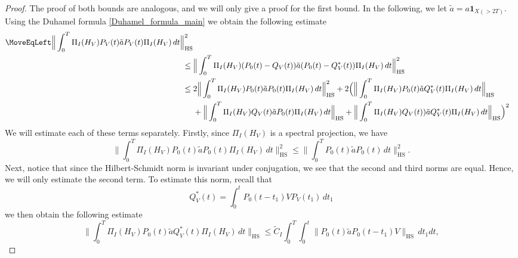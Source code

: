 \documentclass[11pt,twoside,reqno]{amsart}
\newcommand{\1}{\mathrm{\mathbf{1}}}
\newcommand{\bHS}{\mathrm{HS}}
\numberwithin{equation}{section}
\theoremstyle{plain}
\theoremstyle{definition}
\theoremstyle{remark}
\begin{document}
\begin{proof}
The proof of both bounds are analogous, and we will only give a proof for the first bound. In the following, we let $\tilde{a} = a\boldsymbol{1}_{X(>2T)}$. Using the Duhamel formula \eqref{Duhamel_formula_main} we obtain the following estimate 
\begin{equation}\label{EQ:Potential_restriction_2_1}
    \begin{aligned}
       \MoveEqLeft \Big\lVert \int_0^T \Pi_I(H_V) P_V(t) \tilde{a} P_V(t) \Pi_I(H_V) \, d t \Big\rVert_{\bHS}^2 
       \\
       \leq{}& \Big\lVert \int_0^T \Pi_I(H_V) (P_0(t) - Q_V(t))\tilde{a} (P_0(t) -Q_V^*(t)) \Pi_I(H_V) \, d t \Big\rVert_{\bHS}^2 
       \\
       \leq{}& 2\Big\lVert \int_0^T \Pi_I(H_V) P_0(t)  \tilde{a} P_0(t)  \Pi_I(H_V) \, d t \Big\rVert_{\bHS}^2
       +
       2\Big(\Big\lVert \int_0^T \Pi_I(H_V) P_0(t)  \tilde{a} Q_V^*(t) \Pi_I(H_V) \, d t \Big\rVert_{\bHS} 
       \\
       &+
       \Big\lVert \int_0^T \Pi_I(H_V) Q_V(t) \tilde{a} P_0(t)  \Pi_I(H_V) \, d t \Big\rVert_{\bHS} 
       +
       \Big\lVert \int_0^T \Pi_I(H_V) Q_V(t))\tilde{a} Q_V^*(t) \Pi_I(H_V) \, d t \Big\rVert_{\bHS}\Big)^2 
    \end{aligned}
\end{equation}
We will estimate each of these terms separately. Firstly, since $\Pi_I(H_V)$ is a spectral projection, we have
\begin{equation}\label{EQ:Potential_restriction_2_2}
    \Big\lVert \int_0^T \Pi_I(H_V) P_0(t)  \tilde{a} P_0(t)  \Pi_I(H_V) \, d t \Big\rVert_{\bHS}^2
       \leq \Big\lVert \int_0^T P_0(t)  \tilde{a} P_0(t)   \, d t \Big\rVert_{\bHS}^2.
\end{equation}
Next, notice that since the Hilbert-Schmidt norm is invariant under conjugation, we see that the second and third norms are equal. Hence, we will only estimate the second term. To estimate this norm, recall that 
\begin{equation*}
    Q_V^*(t) =  \int_{0}^{t} P_0(t-t_1) V P_V(t_1) \, dt_1
\end{equation*}
we then obtain the following estimate 
\begin{equation*}
    \Big\lVert \int_0^T \Pi_I(H_V) P_0(t)  \tilde{a} Q_V^*(t) \Pi_I(H_V) \, d t \Big\rVert_{\bHS} 
       \leq{} \tilde{C}_I  \int_0^T \int_{0}^{t}  \big\lVert P_0(t)  \tilde{a} P_0(t-t_1) V  \big\rVert_{\bHS}   \, d t_1 d t,  
\end{equation*}

\end{proof}
\end{document}
